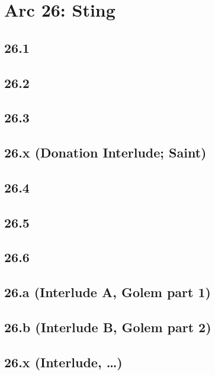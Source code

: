 \part{Arc 26: Sting}
 \chapter{26.1}
 \chapter{26.2}
 \chapter{26.3}
 \chapter{26.x (Donation Interlude; Saint)}
 \chapter{26.4}
 \chapter{26.5}
 \chapter{26.6}
 \chapter{26.a (Interlude A, Golem part 1)}
 \chapter{26.b (Interlude B, Golem part 2)}
 \chapter{26.x (Interlude, …)}











